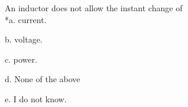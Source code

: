 
An inductor does not allow the instant change of\\

*a. current.

b. voltage.

c. power.

d. None of the above

e. I do not know.\\

